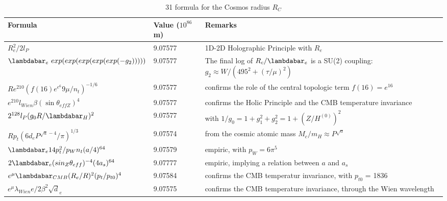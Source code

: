 \documentclass[a4paper,9pt]{article}
\newcounter{col}
\begin{document}
\begin{table}
\caption[Table \ref{CosmosTable}: 31 Cosmos radius formula]{31 formula for the Cosmos radius $R_C$}
\label{CosmosTable}
  \hskip-2.0cm\begin{tabular}{lll}
    \toprule
    \cmidrule(r){1-3}
    Formula     & Value ($10^{86}$m)  & Remarks \\
   \midrule
 
 $ R_e^2/2l_P $ & 9.07577 & 1D-2D Holographic Principle with $R_e$ \cite{Sanchez2}   \\
 
 $ \lambdabar_e ~ exp(exp(exp(exp(exp(-g_2)))))  $ & 9.07577 & The final log of $R_c/\lambdabar_e$ is a SU(2) coupling: $g_2 \approx W/(495^2+(\tau/\mu)^2)$  \\
 
 
 $ R e^{210} (f(16) e^{e^6} 9\mu/n_t)^{-1/6}  $ & 9.07577 & confirms the role of the central topologic term $f(16) = e^{16}$   \\
 
 $e^{210}l_{Wien}\beta (\sin \theta_{effZ})^4$ & 9.07577 & confirms the Holic Principle and the CMB temperature invariance  \\
 
 $ 2^{128} l_P (g_0R/\lambdabar_H)^2 $ & 9.07577 & with $1/g_0 = 1+g_1^2 +g_2^2 = 1 + (Z/H^{(0)})^2$  \\
 
 
 
 
 $ Rp_t (6d_e P^{\sqrt a - 4}/\pi)^{1/3}$ & 9.07574 & from the cosmic atomic mass $M_c/m_H \approx P^{\sqrt a}$  \\
 
 
 
 
 $ \lambdabar_{e} 14 p_t^2/p_Wn_t (a/4)^{64}$ & 9.07579 & empiric, with $p_W = 6\pi^5$ \\
 
 $ 2\lambdabar_{e} (sin_Z \theta_{eff})^{-4} (4a_s)^{64}$ & 9.07777 & empiric, implying a relation between $a$ and $a_s$ \\
 
 
 
 
 
 $ e^{\mu} \lambdabar_{CMB} (R_e/R)^2 (p_t/p_{t0})^4$ & 9.07584 & confirms the CMB temperatur invariance, with $p_{t0}$ = 1836 \\
 
 $ e^{\mu} \lambda_{Wien} e/2\beta^2 \sqrt d_e$ & 9.07575 & confirms the CMB temperature invariance, through the Wien wavelength\\
 

\end{tabular}
\end{table}
\end{document}
